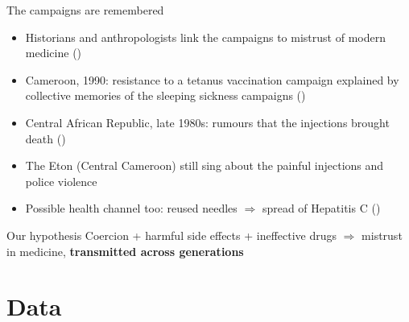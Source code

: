 \documentclass[aspectratio=1610]{beamer}
\newcommand{\refs}[1]{{\footnotesize\color{softgray}(\citealp{#1})}} %
\newcommand{\backupbutton}[2]{\hyperlink{#1}{\beamergotobutton{#2}}}
\begin{document}
\begin{frame}[label=main-memory]{The campaigns are remembered}
  \begin{itemize}
    \item Historians and anthropologists link the campaigns to mistrust of modern medicine
      \refs{headrick_1994,lachenal_2014}
    \item Cameroon, 1990: resistance to a tetanus vaccination campaign explained by
      collective memories of the sleeping sickness campaigns \refs{feldman_etal_2000}
    \item Central African Republic, late 1980s: rumours that the injections brought death
      \refs{giles_vernick_2002}
    \item The Eton (Central Cameroon) still sing about the painful injections and police violence
    \item Possible health channel too: reused needles $\Rightarrow$ spread of Hepatitis C
      \refs{pepin_2011} \backupbutton{bk-iatrogenic}{Details}
  \end{itemize}
  \vspace{0.3em}
  \begin{block}{Our hypothesis}
    Coercion + harmful side effects + ineffective drugs $\Rightarrow$ mistrust in medicine,
    \textbf{transmitted across generations}
  \end{block}
\end{frame}

\section{Data}
\end{document}
